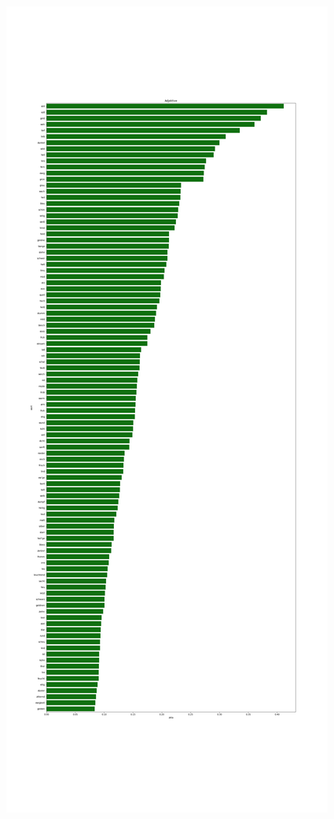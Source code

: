 \documentclass[a4paper,10p]{article}
\begin{document}
\begin{figure}{}
    \centering
    \begin{minipage}[b]{.45\linewidth}
        \centering
        \includegraphics[width=\linewidth]{haupt_adjektive_pro_wort.png}

\end{minipage}
\end{figure}
\end{document}
